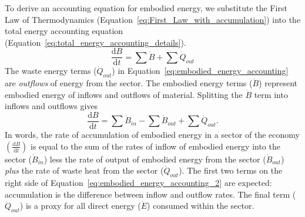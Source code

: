 To derive an accounting equation for embodied energy, we substitute the 
First Law of Thermodynamics
(Equation~\ref{eq:First_Law_with_accumulation})
into the total energy accounting equation (Equation~\ref{eq:total_energy_accounting_details}).
%
\begin{equation} \label{eq:embodied_energy_accounting}
	\frac{\mathrm{d}B}{\mathrm{d}t}
	= \sum \dot{B} 
	+ \sum \dot{Q}_{out}
\end{equation}
%
The waste energy terms ($\dot{Q}_{out}$) 
in Equation~\ref{eq:embodied_energy_accounting}
are \emph{outflows} of energy from the sector. 
The embodied energy 
terms ($\dot{B}$) represent embodied energy of inflows
and outflows of material. Splitting the $\dot{B}$ term
into inflows and outflows gives
%
\begin{equation} \label{eq:embodied_energy_accounting_2}
	\frac{\mathrm{d}B}{\mathrm{d}t}
	= \sum \dot{B}_{in}
	- \sum \dot{B}_{out} 
	+ \sum \dot{Q}_{out}.
\end{equation}
%
In words, the rate of accumulation of embodied energy
in a sector of the economy 
$\left( \frac{\mathrm{d}B}{\mathrm{d}t} \right)$ 
is equal to the sum of the rates of 
inflow of embodied energy into the sector 
	($\dot{B}_{in}$) 
less the rate of output of embodied energy from the sector 
	($\dot{B}_{out}$) 
\emph{plus} the rate of waste heat from the sector 
	($\dot{Q}_{out}$). 
The first two terms on the right side of
Equation~\ref{eq:embodied_energy_accounting_2} are expected: 
accumulation is the difference between inflow and outflow rates. 
The final term ($\dot{Q}_{out}$) is a proxy 
for all direct energy ($\dot{E}$) consumed within the sector.


